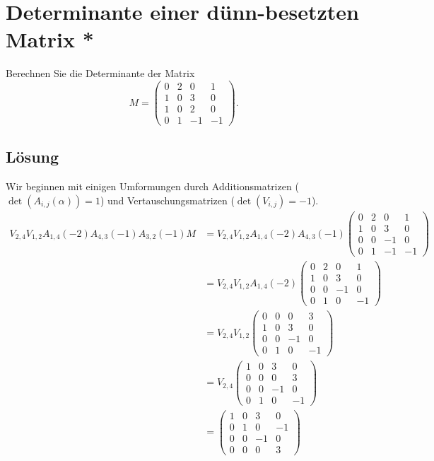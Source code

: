 \section{Determinante einer dünn-besetzten Matrix *}
Berechnen Sie die Determinante der Matrix
$$
	M=\begin{pmatrix}
		0	& 2	&  0& 1	\\
		1	& 0	&  3	& 0	\\
		1	& 0	&  2	& 0\\
		0	& 1	&  -1	& -1	
	\end{pmatrix}.
$$


\subsection*{L\"osung}
Wir beginnen mit einigen Umformungen durch Additionsmatrizen ($\det(A_{i,j}(\alpha))=1$) und Vertauschungsmatrizen ($\det(V_{i,j})=-1$). 
\begin{align*}
V_{2,4}V_{1,2}A_{1,4}(-2)A_{4,3}(-1)A_{3,2}(-1)M&=V_{2,4}V_{1,2}A_{1,4}(-2)A_{4,3}(-1)\begin{pmatrix}
		0	& 2	&  0& 1	\\
		1	& 0	&  3	& 0	\\
		0	& 0	&  -1	& 0\\
		0	& 1	&  -1	& -1	
	\end{pmatrix}\\
	&=V_{2,4}V_{1,2}A_{1,4}(-2)\begin{pmatrix}
		0	& 2	&  0& 1	\\
		1	& 0	&  3	& 0	\\
		0	& 0	&  -1	& 0\\
		0	& 1	&  0	& -1	
	\end{pmatrix}\\
	&=V_{2,4}V_{1,2}\begin{pmatrix}
		0	& 0	&  0& 3	\\
		1	& 0	&  3	& 0	\\
		0	& 0	&  -1	& 0\\
		0	& 1	&  0	& -1	
	\end{pmatrix}\\
	&=V_{2,4}\begin{pmatrix}
		1	& 0	&  3	& 0	\\
		0	& 0	&  0& 3	\\
		0	& 0	&  -1	& 0\\
		0	& 1	&  0	& -1	
	\end{pmatrix}\\
	&=\begin{pmatrix}
		1	& 0	&  3	& 0	\\
		0	& 1	&  0	& -1	\\
		0	& 0	&  -1	& 0\\
		0	& 0	&  0& 3
	\end{pmatrix}
\end{align*}
